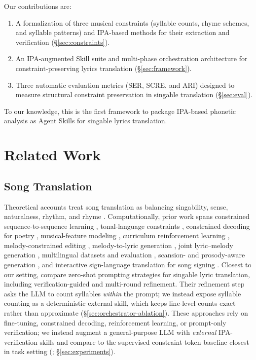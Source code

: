 \documentclass[11pt]{article}
\begin{document}
Our contributions are:
\begin{enumerate}
    \item A formalization of three musical constraints (syllable counts, rhyme schemes, and syllable patterns) and IPA-based methods for their extraction and verification (\S\ref{sec:constraints}).
    \item An IPA-augmented Skill suite and multi-phase orchestration architecture for constraint-preserving lyrics translation (\S\ref{sec:framework}).
    \item Three automatic evaluation metrics (SER, SCRE, and ARI) designed to measure structural constraint preservation in singable translation (\S\ref{sec:eval}).
\end{enumerate}
To our knowledge, this is the first framework to package IPA-based phonetic analysis as Agent Skills for singable lyrics translation.

\section{Related Work}

\subsection{Song Translation}

Theoretical accounts treat song translation as balancing singability, sense, naturalness, rhythm, and rhyme \citep{low-2005-pentathlon,franzon-2008-choices,low-2022-translating}.
Computationally, prior work spans constrained sequence-to-sequence learning \citep{ou-etal-2023-songs}, tonal-language constraints \citep{guo-etal-2022-automatic}, constrained decoding for poetry \citep{ghazvininejad-etal-2018-neural}, musical-feature modeling \citep{ye-etal-2024-sing}, curriculum reinforcement learning \citep{ren-etal-2025-lyricar}, melody-constrained editing \citep{zhao-etal-2025-reffly}, melody-to-lyric generation \citep{ou-etal-2023-loaf}, joint lyric--melody generation \citep{ding-etal-2025-songcomposer}, multilingual datasets and evaluation \citep{cho-etal-2025-mavl,kim-etal-2023-computational,kim-etal-2024-kpop}, scansion- and prosody-aware generation \citep{chen-teufel-2024-scansion,liang-etal-2024-xai,yu-etal-2025-songglm}, and interactive sign-language translation for song signing \citep{yoo-etal-2025-elmi}.
Closest to our setting, \citet{liu-etal-2026-towards} compare zero-shot prompting strategies for singable lyric translation, including verification-guided and multi-round refinement.
Their refinement step asks the LLM to count syllables \emph{within} the prompt; we instead expose syllable counting as a deterministic external skill, which keeps line-level counts exact rather than approximate (\S\ref{sec:orchestrator-ablation}).
These approaches rely on fine-tuning, constrained decoding, reinforcement learning, or prompt-only verification; we instead augment a general-purpose LLM with \emph{external} IPA-verification skills and compare to the supervised constraint-token baseline closest in task setting (\citealp{ou-etal-2023-songs}; \S\ref{sec:experiments}).
\end{document}
